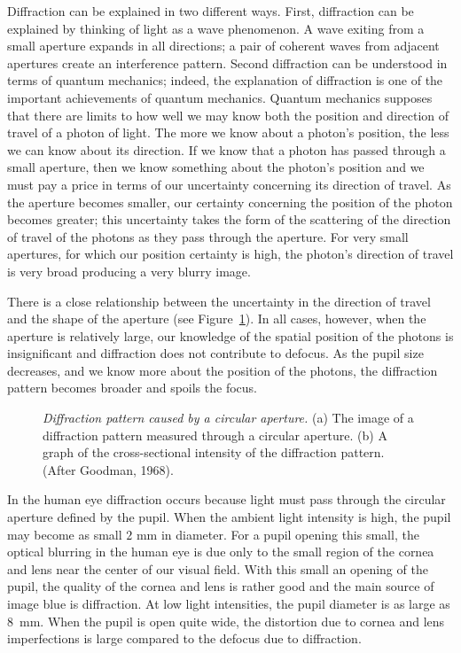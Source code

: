 Diffraction can be explained in two different ways.
First, diffraction can be explained
by thinking of light as a wave phenomenon.
A wave exiting from a small aperture expands in all
directions;
a pair of coherent waves from adjacent apertures create an
interference pattern.
Second diffraction can be understood in terms of quantum mechanics;
indeed, the explanation of diffraction is one of the
important achievements of quantum mechanics.
Quantum mechanics supposes that there are limits
to how well we may know both the position and direction
of travel of a photon of light.
The more we know about a photon's position, the less
we can know about its direction.
If we know that a photon has passed through a small aperture,
then we know something about the photon's position
and we must pay a price in terms of
our uncertainty concerning its direction of travel.
As the aperture becomes smaller, our certainty concerning
the position of the photon becomes greater;
this uncertainty takes the form of the scattering of the
direction of travel of the photons as they pass through the aperture.
For very small apertures, for which our position certainty is high,
the photon's direction of travel is very broad producing a
very blurry image.

There is a close relationship between
the uncertainty in the direction of travel
and the shape of the aperture (see Figure~\ref{f1:diffractionPatterns}).
In all cases, however,
when the aperture is relatively large, 
our knowledge of the spatial position
of the photons is insignificant and diffraction does not
contribute to defocus.
As the pupil size decreases, and we know more about
the position of the photons, the diffraction pattern
becomes broader and spoils the focus.

\begin{figure}
\centerline{
}
\caption[Diffraction]{
{\em Diffraction pattern caused by a circular aperture.}
(a) The image of a diffraction pattern measured through
a circular aperture.
(b) A graph of the cross-sectional intensity of the
diffraction pattern.
(After Goodman, 1968).
}
\label{f1:diffractionPatterns}
\end{figure}
In the human eye diffraction occurs because light
must pass through the circular aperture defined by the pupil.
When the ambient light intensity is high,
the pupil may become as small
$2$ mm in diameter.
For a pupil opening this small, 
the optical blurring in the human eye
is due only to the small region of the cornea
and lens near the center of our visual field.
With this small an opening of the pupil,
the quality of the cornea and lens is rather good
and the main source of image blue is diffraction.
At low light intensities,
the pupil diameter is as large as 8~mm.
When the pupil is open quite wide, the distortion
due to cornea and lens imperfections is large
compared to the defocus due to diffraction.

